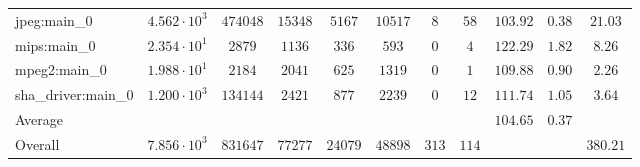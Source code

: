 \begin{tabular}{|l|c|c|c|c|c|c|c|c|c|c|}
jpeg:main\_0            & $ 4.562 \cdot 10^{3} $ & $ 474048 $ & $ 15348 $ & $ 5167  $ & $ 10517 $ & $ 8   $ & $ 58  $ & $ 103.92      $ & $ 0.38    $ & $ 21.03   $ \\
mips:main\_0            & $ 2.354 \cdot 10^{1} $ & $ 2879   $ & $ 1136  $ & $ 336   $ & $ 593   $ & $ 0   $ & $ 4   $ & $ 122.29      $ & $ 1.82    $ & $ 8.26    $ \\
mpeg2:main\_0           & $ 1.988 \cdot 10^{1} $ & $ 2184   $ & $ 2041  $ & $ 625   $ & $ 1319  $ & $ 0   $ & $ 1   $ & $ 109.88      $ & $ 0.90    $ & $ 2.26    $ \\
sha\_driver:main\_0     & $ 1.200 \cdot 10^{3} $ & $ 134144 $ & $ 2421  $ & $ 877   $ & $ 2239  $ & $ 0   $ & $ 12  $ & $ 111.74      $ & $ 1.05    $ & $ 3.64    $ \\
\hline
Average                 & $                    $ & $        $ & $       $ & $       $ & $       $ & $     $ & $     $ & $ 104.65      $ & $ 0.37    $ & $         $ \\
\hline
Overall                 & $ 7.856 \cdot 10^{3} $ & $ 831647 $ & $ 77277 $ & $ 24079 $ & $ 48898 $ & $ 313 $ & $ 114 $ & $             $ & $         $ & $ 380.21  $ \\
\hline
\end{tabular}
